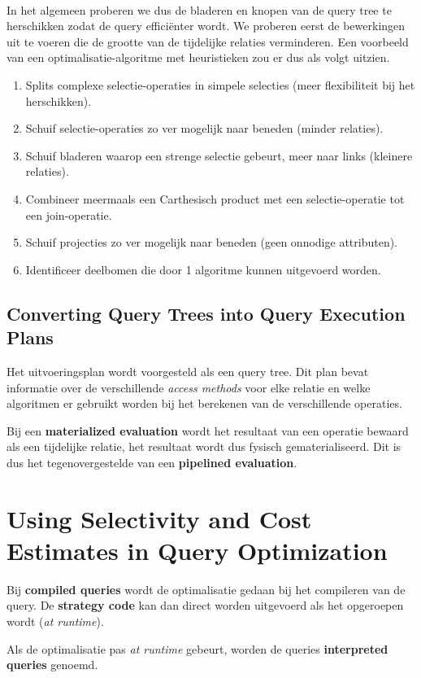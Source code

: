 ~

\noindent In het algemeen proberen we dus de bladeren en knopen van de query tree te herschikken zodat de query effici\"enter wordt. We proberen eerst de bewerkingen uit te voeren die de grootte van de tijdelijke relaties verminderen. Een voorbeeld van een optimalisatie-algoritme met heuristieken zou er dus als volgt uitzien.
\begin{enumerate}
	\item Splits complexe selectie-operaties in simpele selecties (meer flexibiliteit bij het herschikken).
	\item Schuif selectie-operaties zo ver mogelijk naar beneden (minder relaties).
	\item Schuif bladeren waarop een strenge selectie gebeurt, meer naar links (kleinere relaties).
	\item Combineer meermaals een Carthesisch product met een selectie-operatie tot een join-operatie.
	\item Schuif projecties zo ver mogelijk naar beneden (geen onnodige attributen).
	\item Identificeer deelbomen die door 1 algoritme kunnen uitgevoerd worden.
\end{enumerate}


\subsection{Converting Query Trees into Query Execution Plans}
Het uitvoeringsplan wordt voorgesteld als een query tree. Dit plan bevat informatie over de verschillende \textit{access methods} voor elke relatie en welke algoritmen er gebruikt worden bij het berekenen van de verschillende operaties.

Bij een \textbf{materialized evaluation} wordt het resultaat van een operatie bewaard als een tijdelijke relatie, het resultaat wordt dus fysisch gematerialiseerd. Dit is dus het tegenovergestelde van een \textbf{pipelined evaluation}.



\section{Using Selectivity and Cost Estimates in Query Optimization}
Bij \textbf{compiled queries} wordt de optimalisatie gedaan bij het compileren van de query. De \textbf{strategy code} kan dan direct worden uitgevoerd als het opgeroepen wordt (\textit{at runtime}).

Als de optimalisatie pas \textit{at runtime} gebeurt, worden de queries \textbf{interpreted queries} genoemd.

